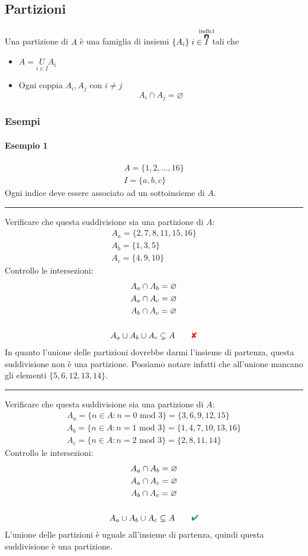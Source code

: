 \documentclass[italian]{article}
\newcommand{\mmod}{\text{ mod }}
\newcommand{\linea}{\begin{center}\rule{5cm}{1pt}\end{center}}
\newcommand{\crossmark}{\textcolor{red}{\text{$\qquad$\ding{56}}}}
\renewcommand{\checkmark}{\textcolor{ForestGreen}{\text{$\qquad$\ding{52}}}}
\begin{document}
\subsection{Partizioni}
Una partizione di $A$ è una famiglia di insiemi $\{ A_i \} \; i \in \overbracket{I}^{\mathclap{\text{indici}}}$ tali che
\begin{itemize}
	\item $A = \underset{i\in I}{U}  A_i$ 
	\item Ogni coppia $A_i, A_j$ con $i\neq j$
		\[
			A_i \cap A_j = \varnothing
		\]
\end{itemize}

\newpage
\subsubsection{Esempi}
\paragraph{Esempio 1}
\begin{gather*}
	A = \{ 1,2, ..., 16 \} \\
	I = \{ a,b,c \} 
\end{gather*}
Ogni indice deve essere associato ad un sottoinsieme di $A$.
\linea
Verificare che questa suddivisione sia una partizione di $A$:
\begin{gather*}
	A_a = \{ 2,7,8,11,15,16 \} \\
	A_b = \{ 1,3,5 \} \\
	A_c = \{ 4,9,10 \}
\end{gather*}
Controllo le intersezioni:
\begin{gather*}
	A_a \cap A_b = \varnothing \\
	A_a \cap A_c = \varnothing \\
	A_b \cap A_c = \varnothing \\\\
	A_a \cup A_b \cup A_c \subsetneq A \crossmark
\end{gather*}
In quanto l'unione delle partizioni dovrebbe darmi l'insieme di partenza, questa suddivisione non è una partizione. Possiamo notare infatti che all'unione mancano gli elementi $\{ 5,6,12,13,14 \}$.
\linea
Verificare che questa suddivisione sia una partizione di $A$:
\begin{gather*}
	A_a = \{ n \in A : n=0 \mmod 3 \} = \{ 3,6,9,12,15 \}\\
	A_b = \{ n \in A : n=1 \mmod 3 \} = \{ 1,4,7,10,13,16 \}\\
	A_c = \{ n \in A : n=2 \mmod 3 \} = \{ 2,8,11,14 \}
\end{gather*}
Controllo le intersezioni:
\begin{gather*}
	A_a \cap A_b = \varnothing \\
	A_a \cap A_c = \varnothing \\
	A_b \cap A_c = \varnothing \\\\
	A_a \cup A_b \cup A_c \subseteq A \checkmark
\end{gather*}
L'unione delle partizioni è uguale all'insieme di partenza, quindi questa suddivisione è una partizione.
\end{document}

